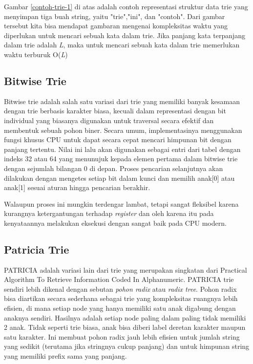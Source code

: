 Gambar \ref{contoh-trie-1} di atas adalah contoh representasi struktur data trie yang menyimpan tiga buah string, yaitu "trie","ini", dan "contoh". Dari gambar tersebut kita bisa mendapat gambaran mengenai kompleksitas waktu yang diperlukan untuk mencari sebuah kata dalam trie. Jika panjang kata terpanjang dalam trie adalah \textit{L}, maka untuk mencari sebuah kata dalam trie memerlukan waktu terburuk O(\textit{L})

\subsection{Bitwise Trie}
\label{sec:bitwiseTrie}

Bitwise trie adalah salah satu variasi dari trie yang memiliki banyak kesamaan dengan trie berbasis karakter biasa, kecuali dalam representasi dengan bit individual yang biasanya digunakan untuk traversal secara efektif dan membentuk sebuah pohon biner. Secara umum, implementasinya menggunakan fungsi khusus CPU untuk dapat secara cepat mencari himpunan bit dengan panjang tertentu. Nilai ini lalu akan digunakan sebagai entri dari tabel dengan indeks 32 atau 64 yang menunujuk kepada elemen pertama dalam bitwise trie dengan sejumlah bilangan 0 di depan. Proses pencarian selanjutnya akan dilakukan dengan mengetes setiap bit dalam kunci dan memilih anak[0] atau anak[1] sesuai aturan hingga pencarian berakhir.

Walaupun proses ini mungkin terdengar lambat, tetapi sangat fleksibel karena kurangnya ketergantungan terhadap \textit{register} dan oleh karena itu pada kenyataannya melakukan eksekusi dengan sangat baik pada CPU modern.

\subsection{Patricia Trie}
\label{sec:patriciaTrie}

PATRICIA adalah variasi lain dari trie yang merupakan singkatan dari Practical Algorithm To Retrieve Information Coded In Alphanumeric. PATRICIA trie sendiri lebih dikenal dengan sebutan \textit{pohon radix} atau \textit{radix tree}. Pohon radix bisa diartikan secara sederhana sebagai trie yang kompleksitas ruangnya lebih efisien, di mana setiap node yang hanya memiliki satu anak digabung dengan anaknya sendiri. Hasilnya adalah setiap node paling dalam paling tidak memiliki 2 anak. Tidak seperti trie biasa, anak bisa diberi label deretan karakter maupun satu karakter. Ini membuat pohon radix jauh lebih efisien untuk jumlah string yang sedikit (terutama jika stringnya cukup panjang) dan untuk himpunan string yang memiliki prefix sama yang panjang.


